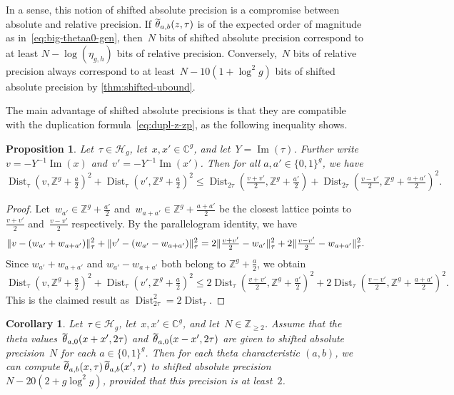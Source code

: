 \documentclass[12pt,oneside]{amsart}
\numberwithin{equation}{section}
\newtheorem{prop}[equation]{Proposition}
\newtheorem{cor}[equation]{Corollary}
\theoremstyle{definition}
\newcommand{\Z}{\mathbb{Z}}
\newcommand{\C}{\mathbb{C}}
\newcommand{\Half}{\mathcal{H}}
\DeclareMathOperator{\im}{Im}
\DeclareMathOperator{\Dist}{Dist}
\DeclareMathOperator{\thetatilde}{\rlap{\raisebox{-0.1ex}{$\widetilde{\phantom{\,t}}$}}\theta}
\DeclarePairedDelimiter{\norm}{\|}{\|}
\begin{document}
In a sense, this notion of shifted absolute precision is a compromise between
absolute and relative precision. If $\thetatilde_{a,b}(z,\tau)$ is of the
expected order of magnitude as in~\eqref{eq:big-thetaa0-gen}, then~$N$ bits of
shifted absolute precision correspond to at least $N-\log(\eta_{g,h})$ bits of
relative precision. Conversely,~$N$ bits of relative precision always
correspond to at least~$N - 10(1+\log^2 g)$ bits of shifted absolute precision
by \cref{thm:shifted-ubound}.

The main advantage of shifted absolute precisions is that they are compatible
with the duplication formula~\eqref{eq:dupl-z-zp}, as the following inequality
shows.

\begin{prop}
  \label{prop:dist-inequality}
  Let~$\tau\in \Half_g$, let~$x,x'\in \C^g$, and let~$Y = \im(\tau)$. Further
  write $v = -Y^{-1}\im(x)$ and~$v' = -Y^{-1}\im(x')$. Then for all
  $a,a'\in \{0,1\}^g$, we have
  \begin{displaymath}
    \Dist_\tau(v, \Z^g + \tfrac{a}{2})^2 + \Dist_\tau(v', \Z^g + \tfrac{a}{2})^2 \leq \Dist_{2\tau}(\tfrac{v+v'}{2},\Z^g + \tfrac{a'}2)
    + \Dist_{2\tau}(\tfrac{v-v'}{2}, \Z^g + \tfrac{a+a'}{2})^2.
  \end{displaymath}
\end{prop}

\begin{proof}
  Let~$w_{a'}\in \Z^g + \tfrac{a'}{2}$ and~$w_{a+a'}\in \Z^g + \tfrac{a+a'}{2}$
  be the closest lattice points to $\tfrac{v+v'}{2}$ and~$\tfrac{v-v'}{2}$
  respectively. By the parallelogram identity, we have
  \begin{displaymath}
    \norm{v - (w_{a'} + w_{a+a'})}_\tau^2
    + \norm{v' - (w_{a'} - w_{a+a'})}_\tau^2 =
    2\norm{\tfrac{v+v'}{2} - w_{a'}}_\tau^2 + 2\norm{\tfrac{v-v'}{2} - w_{a+a'}}_\tau^2.
  \end{displaymath}
  Since $w_{a'} + w_{a+a'}$ and $w_{a'} - w_{a+a'}$ both belong to $\Z^g + \tfrac{a}{2}$, we obtain
  \begin{displaymath}
    \Dist_\tau(v, \Z^g + \tfrac{a}{2})^2 + \Dist_\tau(v', \Z^g + \tfrac{a}{2})^2 \leq
    2\Dist_\tau(\tfrac{v+v'}{2},\Z^g + \tfrac{a'}2)^2 + 2 \Dist_{\tau}(\tfrac{v-v'}{2}, \Z^g + \tfrac{a+a'}{2})^2.
  \end{displaymath}
  This is the claimed result as $\Dist_{2\tau}^2 = 2\Dist_\tau$.
\end{proof}

\begin{cor}
  \label{cor:simple-precisions}
  Let~$\tau\in \Half_g$, let~$x,x'\in \C^g$, and let~$N\in \Z_{\geq 2}$. Assume
  that the theta values~$\thetatilde_{a,0}(x+x',2\tau)$
  and~$\thetatilde_{a,0}(x-x',2\tau)$ are given to shifted absolute
  precision~$N$ for each $a\in \{0,1\}^g$. Then for each theta characteristic
  $(a,b)$, we can compute $\thetatilde_{a,b}(x,\tau)\thetatilde_{a,b}(x',\tau)$
  to shifted absolute precision~$N - 20(2 + g\log^2 g)$, provided that this
  precision is at least~$2$.
\end{cor}
\end{document}
